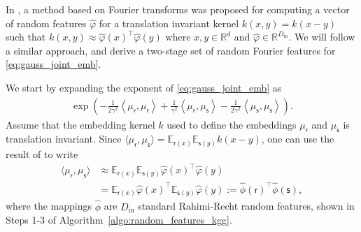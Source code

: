 \documentclass[english]{article}
\theoremstyle{plain}
\theoremstyle{plain}
\begin{document}
In \cite{Rahimi2007}, a method based on Fourier transforms was proposed for computing a vector
of random features $\hat{\varphi}$ for a translation invariant kernel $k(x,y) = k(x-y)$
 such that $k(x, y) \approx \hat{\varphi}(x)^\top \hat{\varphi}(y)$
where $x,y \in \mathbb{R}^d$ and $\hat{\varphi} \in \mathbb{R}^{D_\mathrm{in}}$.  
We will follow a similar approach, and derive 
a two-stage set of random Fourier features for \eqref{eq:gauss_joint_emb}.

We start by expanding the  exponent 
of \eqref{eq:gauss_joint_emb} as
%
\begin{align*}
  \exp\left(-\frac{1}{2\gamma^{2}}\left\langle \mu_{\mathsf{r}},\mu_{\mathsf{r}}\right\rangle +\frac{1}{\gamma^{2}}\left\langle \mu_{\mathsf{r}},\mu_{\mathsf{s}}\right\rangle -\frac{1}{2\gamma^{2}}\left\langle \mu_{\mathsf{s}},\mu_{\mathsf{s}}\right\rangle \right).
\end{align*}
%
Assume that the embedding kernel $k$ used to define the embeddings $\mu_\mathsf{r}$ 
and $\mu_\mathsf{s}$ is translation invariant. Since 
$\langle \mu_{\mathsf{r}},\mu_{\mathsf{s}}  \rangle
= \mathbb{E}_{\mathsf{r}(x)} \mathbb{E}_{\mathsf{s}(y)} k(x-y)$, one can use 
the result of \cite{Rahimi2007} to write
%
\begin{align*}
 \langle \mu_{\mathsf{r}},\mu_{\mathsf{s}}  \rangle
 & \approx \mathbb{E}_{\mathsf{r}(x)} \mathbb{E}_{\mathsf{s}(y)} 
   \hat{\varphi}(x)^\top \hat{\varphi}(y) \nonumber \\ 
 & = \mathbb{E}_{\mathsf{r}(x)} 
   \hat{\varphi}(x)^\top \mathbb{E}_{\mathsf{s}(y)}  \hat{\varphi}(y) 
 := \hat{\phi}(\mathsf{r})^\top \hat{\phi}(\mathsf{s}),
\end{align*}
%
where the mappings $\hat{\phi}$ are $D_\mathrm{in}$ standard Rahimi-Recht random features, shown in Steps 1-3 of Algorithm~\ref{algo:random_features_kgg}.
\end{document}
